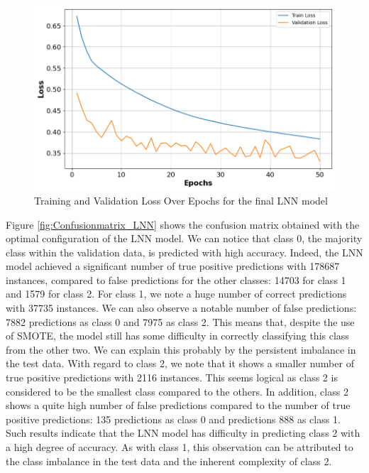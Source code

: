 \documentclass[12pt,oneside]{book} %
\begin{document}
\begin{figure}[H]
    \centering
    \includegraphics[width=\linewidth]{Image/LNN_loss.png}
    \caption{\centering Training and Validation Loss Over Epochs  for the final LNN model}
    \label{fig:LNN_Loss}
\end{figure}

\noindent Figure \ref{fig:Confusionmatrix_LNN} shows the confusion matrix obtained with the optimal configuration of the LNN model. We can notice that class 0, the majority class within the validation data, is predicted with high accuracy. Indeed, the LNN model achieved a significant number of true positive predictions with 178687 instances, compared to false predictions for the other classes: 14703 for class 1 and 1579 for class 2.  For class 1, we note a huge number of correct predictions with 37735 instances. We can also observe a notable number of false predictions: 7882 predictions as class 0 and 7975 as class 2. This means that, despite the use of SMOTE, the model still has some difficulty in correctly classifying this class from the other two. We can explain this probably by the persistent imbalance in the test data. With regard to class 2, we note that it shows a smaller number of true positive predictions with 2116 instances. This seems logical as class 2 is considered to be the smallest class compared to the others. In addition, class 2 shows a quite high number of false predictions compared to the number of true positive predictions: 135 predictions as class 0 and predictions 888 as class 1. Such results indicate that the LNN model has difficulty in predicting class 2 with a high degree of accuracy. As with class 1, this observation can be attributed to the class imbalance in the test data and the inherent complexity of class 2.
\end{document}
